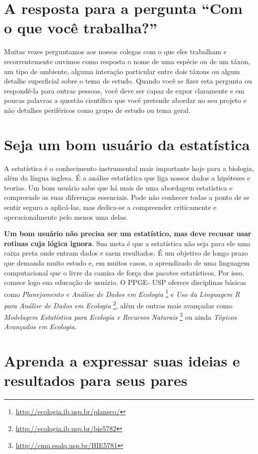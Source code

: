 \documentclass[twoside a4paper 12pt]{report}
\begin{document}
\section{A resposta para a pergunta “Com o que você trabalha?”}

Muitas vezes perguntamos aos nossos colegas com o que eles trabalham e
recorrentemente ouvimos como resposta o nome de uma espécie ou de um
táxon, um tipo de ambiente, alguma interação particular entre dois
táxons ou algum detalhe superficial sobre o tema de estudo. Quando
você se fizer esta pergunta ou respondê-la para outras pessoas, você
deve ser capaz de expor claramente e em poucas palavras a questão
científica que você pretende abordar no seu projeto e não detalhes
periféricos como grupo de estudo ou tema geral.

\section{Seja um bom usuário da estatística}

A estatística é o conhecimento instrumental mais importante hoje para
a biologia, além da língua inglesa. É a análise estatística que liga
nossos dados a hipóteses e teorias. Um bom usuário sabe que há mais de
uma abordagem estatística e compreende as suas diferenças
essenciais. Pode não conhecer todas a ponto de se sentir seguro a
aplicá-las, mas dedica-se a compreender criticamente e
operacionalmente pelo menos uma delas.

\textbf{Um bom usuário não precisa ser um estatístico, mas deve
  recusar usar rotinas cuja lógica ignora}. Sua meta é que a
estatística não seja para ele uma caixa preta onde entram dados e saem
resultados. É um objetivo de longo prazo que demanda muito estudo e,
em muitos casos, o aprendizado de uma linguagem computacional que o
livre da camisa de força dos pacotes estatísticos. Por isso, comece
logo sua educação de usuário. O PPGE- USP oferece disciplinas básicas
como \emph{Planejamento e Análise de Dados em Ecologia}
\footnote{\url{http://ecologia.ib.usp.br/planeco/}} e \emph{Uso da
  Linguagem R para Análise de Dados em Ecologia}
\footnote{\url{http://ecologia.ib.usp.br/bie5782}}, além de outras
mais avançadas como \emph{Modelagem Estatística para Ecologia e
  Recursos Naturais} \footnote{\url{http://cmq.esalq.usp.br/BIE5781}}
ou ainda \emph{Tópicos Avançados em Ecologia}.

\section{Aprenda a expressar suas ideias e resultados para seus pares}
\end{document}
